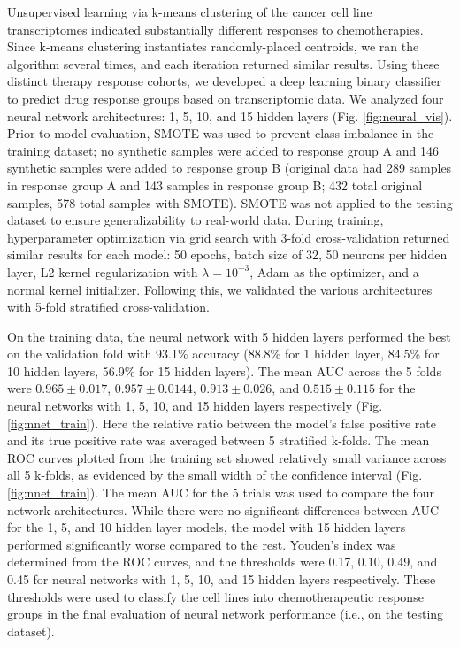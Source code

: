 \documentclass[10pt, letterpaper, twocolumn]{article}
\begin{document}
Unsupervised learning via k-means clustering of the cancer cell line transcriptomes indicated substantially different responses to chemotherapies. Since k-means clustering instantiates randomly-placed centroids, we ran the algorithm several times, and each iteration returned similar results. Using these distinct therapy response cohorts, we developed a deep learning binary classifier to predict drug response groups based on transcriptomic data. We analyzed four neural network architectures: 1, 5, 10, and 15 hidden layers (Fig. \ref{fig:neural_vis}). Prior to model evaluation, SMOTE was used to prevent class imbalance in the training dataset; no synthetic samples were added to response group A and 146 synthetic samples were added to response group B (original data had 289 samples in response group A and 143 samples in response group B; 432 total original samples, 578 total samples with SMOTE). SMOTE was not applied to the testing dataset to ensure generalizability to real-world data. During training, hyperparameter optimization via grid search with 3-fold cross-validation returned similar results for each model: 50 epochs, batch size of 32, 50 neurons per hidden layer, L2 kernel regularization with $\lambda=10^{-3}$, Adam as the optimizer, and a normal kernel initializer. Following this, we validated the various architectures with 5-fold stratified cross-validation.

On the training data, the neural network with 5 hidden layers performed the best on the validation fold with 93.1\% accuracy (88.8\% for 1 hidden layer, 84.5\% for 10 hidden layers, 56.9\% for 15 hidden layers). The mean AUC across the 5 folds were $0.965 \pm 0.017$, $0.957 \pm 0.0144$, $0.913 \pm 0.026$, and $0.515 \pm 0.115$ for the neural networks with 1, 5, 10, and 15 hidden layers respectively (Fig. \ref{fig:nnet_train}). Here the relative ratio between the model’s false positive rate and its true positive rate was averaged between 5 stratified k-folds. The mean ROC curves plotted from the training set showed relatively small variance across all 5 k-folds, as evidenced by the small width of the confidence interval (Fig. \ref{fig:nnet_train}). The mean AUC for the 5 trials was used to compare the four network architectures. While there were no significant differences between AUC for the 1, 5, and 10 hidden layer models, the model with 15 hidden layers performed significantly worse compared to the rest. Youden's index was determined from the ROC curves, and the thresholds were 0.17, 0.10, 0.49, and 0.45 for neural networks with 1, 5, 10, and 15 hidden layers respectively. These thresholds were used to classify the cell lines into chemotherapeutic response groups in the final evaluation of neural network performance (i.e., on the testing dataset).
\end{document}
